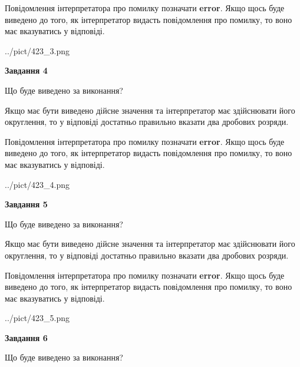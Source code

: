 \documentclass[12pt, ukrainian]{article}
\begin{document}
{\begin {Large}
Повідомлення інтерпретатора про помилку позначати \textbf{error}.
Якщо щось буде виведено до того, як інтерпретатор видасть повідомлення про помилку, 
то воно має вказуватись у відповіді. \par

\begin{center}
	{../pict/423_3.png}
\end{center}
\newpage

{\begin {center}\textbf{Завдання 4}\end {center}}\par
Що буде виведено за виконання? \par

Якщо має бути виведено дійсне значення та інтерпретатор має здійснювати його округлення, 
то у відповіді достатньо правильно вказати два дробових розряди.

Повідомлення інтерпретатора про помилку позначати \textbf{error}.
Якщо щось буде виведено до того, як інтерпретатор видасть повідомлення про помилку, 
то воно має вказуватись у відповіді. \par

\begin{center}
	{../pict/423_4.png}
\end{center}
\newpage

{\begin {center}\textbf{Завдання 5}\end {center}}\par
Що буде виведено за виконання? \par

Якщо має бути виведено дійсне значення та інтерпретатор має здійснювати його округлення, 
то у відповіді достатньо правильно вказати два дробових розряди.

Повідомлення інтерпретатора про помилку позначати \textbf{error}.
Якщо щось буде виведено до того, як інтерпретатор видасть повідомлення про помилку, 
то воно має вказуватись у відповіді. \par

\begin{center}
	{../pict/423_5.png}
\end{center}
\newpage

{\begin {center}\textbf{Завдання 6}\end {center}}\par
Що буде виведено за виконання? \par


\end{Large}}
\end{document}
